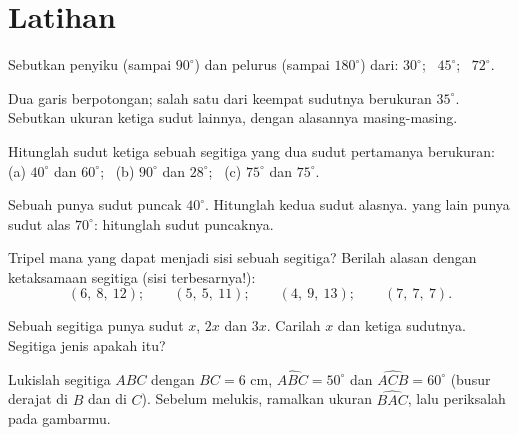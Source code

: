 \section{Latihan}

\begin{exercise}[$\star$]\label{exo:g7:triangles:1}
Sebutkan penyiku (sampai $90^\circ$) dan pelurus (sampai
$180^\circ$) dari: $30^\circ$; \ $45^\circ$; \ $72^\circ$.
\end{exercise}

\begin{exercise}[$\star$]\label{exo:g7:triangles:2}
Dua garis berpotongan; salah satu dari keempat sudutnya berukuran
$35^\circ$. Sebutkan ukuran ketiga sudut lainnya, dengan alasannya
masing-masing.
\end{exercise}

\begin{exercise}[$\star$]\label{exo:g7:triangles:3}
Hitunglah sudut ketiga sebuah segitiga yang dua sudut pertamanya
berukuran:
(a) $40^\circ$ dan $60^\circ$; \
(b) $90^\circ$ dan $28^\circ$; \
(c) $75^\circ$ dan $75^\circ$.
\end{exercise}

\begin{exercise}[$\star$]\label{exo:g7:triangles:4}
Sebuah  punya sudut puncak $40^\circ$. Hitunglah
kedua sudut alasnya.  yang lain punya sudut alas
$70^\circ$: hitunglah sudut puncaknya.
\end{exercise}

\begin{exercise}[$\star$]\label{exo:g7:triangles:5}
Tripel mana yang dapat menjadi sisi sebuah segitiga? Berilah alasan
dengan ketaksamaan segitiga (sisi terbesarnya!):
\[
(6,\ 8,\ 12); \qquad
(5,\ 5,\ 11); \qquad
(4,\ 9,\ 13); \qquad
(7,\ 7,\ 7).
\]
\end{exercise}

\begin{exercise}[$\star$]\label{exo:g7:triangles:6}
Sebuah segitiga punya sudut $x$, $2x$ dan $3x$. Carilah $x$ dan ketiga
sudutnya. Segitiga jenis apakah itu?
\end{exercise}

\begin{exercise}[$\star$]\label{exo:g7:triangles:7}
Lukislah segitiga $ABC$ dengan $BC = 6$ cm,
$\widehat{ABC} = 50^\circ$ dan $\widehat{ACB} = 60^\circ$ (busur
derajat di $B$ dan di $C$). Sebelum melukis, ramalkan ukuran
$\widehat{BAC}$, lalu periksalah pada gambarmu.
\end{exercise}

